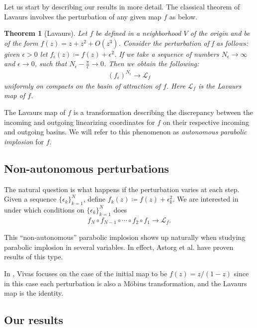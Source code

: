 \documentclass{amsart}
\newtheorem{thm}{Theorem}
\theoremstyle{remark}
\theoremstyle{definition}
\begin{document}
Let us start by describing our results in more detail. The classical theorem of Lavaurs involves the perturbation of any given map $f$ as below.
 \begin{thm}[Lavaurs]
    Let $f$ be defined in a neighborhood $V$ of the origin and be of the form $f(z)=z+z^{2}+O(z^{3})$. Consider the perturbation of f as follows: given $\epsilon>0 $ let $f_\epsilon(z) \coloneqq f(z)+\epsilon^2$. If we take a sequence of numbers $N_\epsilon \to \infty$ and $\epsilon \to 0$, such that $N_\epsilon-\frac{\pi}{\epsilon}\rightarrow 0$. Then we obtain the following:
    \begin{align*}
        (f_\epsilon)^{N_\epsilon} \rightarrow \mathcal{L}_f
    \end{align*}
    uniformly on compacts on the basin of attraction of $f$. Here $\mathcal{L}_f$ is the Lavaurs map of $f$.
\end{thm} 

The Lavaurs map of $f$ is a transformation describing the discrepancy between the incoming and outgoing linearizing coordinates for $f$ on their respective incoming and outgoing basins.  We will refer to this phenomenon as \textit{autonomous parabolic implosion} for $f$.

\subsection{Non-autonomous perturbations} The natural question is what happens if the perturbation varies at
each step. Given a sequence $\{\epsilon_{k}\}_{k=1}^{N}$, define $f_{k}(z)\coloneqq f(z)+\epsilon_{k}^2$. We are interested in under which conditions on $\{\epsilon_{k}\}_{k=1}^{N}$ does 
\begin{align*}
     f_N\circ f_{N-1}\circ \cdots\circ f_2\circ f_1 \rightarrow  \mathcal{L}_{f}.
\end{align*}

This ``non-autonomous'' parabolic implosion shows up naturally when studying parabolic implosion in several variables. In effect, Astorg et al. \cite{AstBia24,ABD+16,AstBoc22} have proven results of this type.

In \cite{Viv20}, Vivas focuses on the case of the initial map to be $f(z)=z/(1-z)$ since in this case each perturbation is also a M\"obius transformation, and the Lavaurs map is the identity. 

\subsection{Our results} 
\end{document}
